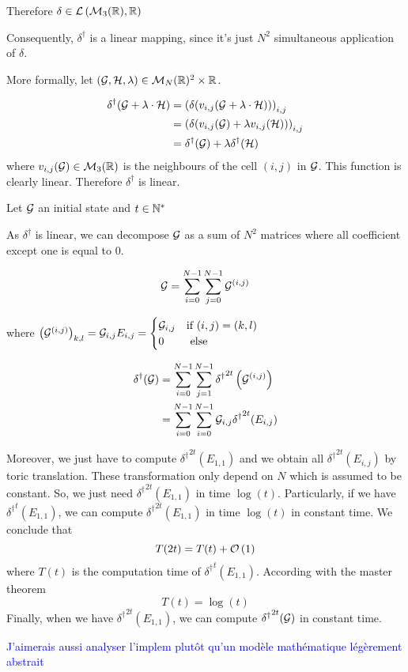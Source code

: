 Therefore $\delta \in \mathcal{L}\left( \mathcal{M}_3(\mathbb{R}), \mathbb{R}\right)$

Consequently, $\delta^\dagger$ is a linear mapping, since it's just $N^2$ simultaneous application of $\delta$.

More formally, let $(\mathcal{G},\mathcal{H},\lambda) \in \mathcal{M}_N(\mathbb{R})^2\times \mathbb{R}$.

$$
    \begin{aligned}
        \delta^\dagger(\mathcal{G}+\lambda\cdot\mathcal{H}) &= \left( \delta(v_{i,j}(\mathcal{G}+\lambda\cdot\mathcal{H})) \right)_{i,j}\\
        &= \left( \delta(v_{i,j}(\mathcal{G})+\lambda v_{i,j}(\mathcal{H})) \right)_{i,j}\\
        &= \delta^\dagger(\mathcal{G})+\lambda \delta^\dagger(\mathcal{H})
    \end{aligned}
$$
where $v_{i,j}(\mathcal{G}) \in \mathcal{M}_3(\mathbb{R})$ is the neighbours of the cell $(i,j)$ in $\mathcal{G}$. This function is clearly linear. Therefore $\delta^\dagger$ is linear.

Let $\mathcal{G}$ an initial state and $t\in\mathbb{N}^*$

As $\delta^\dagger$ is linear, we can decompose $\mathcal{G}$ as a sum of $N^2$ matrices where all coefficient except one is equal to 0. 

$$
    \mathcal{G}=\sum\limits_{i=0}^{N-1}\sum\limits_{j=0}^{N-1} \mathcal{G}^{(i,j)}
$$

where $\left(\mathcal{G}^{(i,j)}\right)_{k,l}=\mathcal{G}_{i,j}E_{i,j}=\begin{cases} \mathcal{G}_{i,j} & \text{if }(i,j)=(k,l)\\0&\text{ else} \end{cases}$

$$
    \begin{aligned}
        \delta^\dagger(\mathcal{G}) &= \sum\limits_{i=0}^{N-1}\sum\limits_{j=1}^{N-1} {\delta^\dagger}^{2t}\left(\mathcal{G}^{(i,j)}\right)\\
        &= \sum\limits_{i=0}^{N-1} \sum\limits_{i=0}^{N-1} \mathcal{G}_{i,j} {\delta^\dagger}^{2t}(E_{i,j})
    \end{aligned}
$$

Moreover, we just have to compute ${\delta^\dagger}^{2t}(E_{1,1})$ and we obtain all ${\delta^\dagger}^{2t}(E_{i,j})$ by toric translation. These transformation only depend on $N$ which is assumed to be constant. So, we just need ${\delta^\dagger}^{2t}(E_{1,1})$ in time $\log(t)$. Particularly, if we have ${\delta^\dagger}^{t}(E_{1,1})$, we can compute ${\delta^\dagger}^{2t}(E_{1,1})$ in time $\log(t)$ in constant time. We conclude that
$$
    T(2t) = T(t) + \mathcal O \left( 1 \right)
$$
where $T(t)$ is the computation time of ${\delta^\dagger}^t(E_{1,1})$. According with the master theorem
$$
    T(t)=\log(t)
$$
Finally, when we have ${\delta^\dagger}^{2t}(E_{1,1})$, we can compute ${\delta^\dagger}^{2t}(\mathcal{G})$ in constant time.

\textcolor{blue}{J'aimerais aussi analyser l'implem plutôt qu'un modèle mathématique légèrement abstrait}



